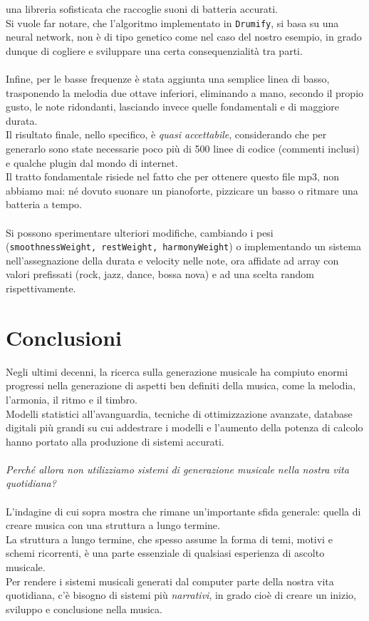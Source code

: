\documentclass[a4paper,12pt]{report}
\begin{document}
una libreria sofisticata che raccoglie suoni di batteria accurati. \\
Si vuole far notare, che l'algoritmo implementato in \texttt{Drumify}, si basa su una neural network, non è di tipo genetico come nel caso del nostro esempio, in grado dunque di cogliere e sviluppare una certa consequenzialità tra parti. \\
\\
Infine, per le basse frequenze è stata aggiunta una semplice linea di basso, trasponendo la melodia due ottave inferiori, eliminando a mano, secondo il propio gusto, le note ridondanti, lasciando invece quelle fondamentali e di maggiore durata. \\
Il risultato finale, nello specifico, è \textit{quasi accettabile}, considerando che per generarlo sono state necessarie poco più di 500 linee di codice (commenti inclusi) e qualche plugin dal mondo di internet. \\
Il tratto fondamentale risiede nel fatto che per ottenere questo file mp3, non abbiamo mai: né dovuto suonare un pianoforte, pizzicare un basso o ritmare una batteria a tempo. \\
\\
Si possono sperimentare ulteriori modifiche, cambiando i pesi (\texttt{smoothnessWeight, restWeight, harmonyWeight}) o implementando un sistema nell'assegnazione della durata e velocity nelle note, ora affidate ad array con valori prefissati (rock, jazz, dance, bossa nova) e ad una scelta random rispettivamente.

\chapter{Conclusioni}

Negli ultimi decenni, la ricerca sulla generazione musicale ha compiuto enormi progressi nella generazione di aspetti ben definiti della musica, come la melodia, l’armonia, il ritmo e il timbro. \\
Modelli statistici all’avanguardia, tecniche di ottimizzazione avanzate, database digitali più grandi su cui addestrare i modelli e l’aumento della potenza di calcolo hanno portato alla produzione di sistemi accurati. \\
\\
\textit{Perché allora non utilizziamo sistemi di generazione musicale nella nostra vita quotidiana?} \\
\\
L’indagine di cui sopra mostra che rimane un’importante sfida generale: quella di creare musica con una struttura a lungo termine. \\
La struttura a lungo termine, che spesso assume la forma di temi, motivi e schemi ricorrenti, è una parte essenziale di qualsiasi esperienza di ascolto musicale. \\
Per rendere i sistemi musicali generati dal computer parte della nostra vita quotidiana, c’è bisogno di sistemi più \textit{narrativi}, in grado cioè di creare un inizio, sviluppo e conclusione nella musica. \\
\end{document}
